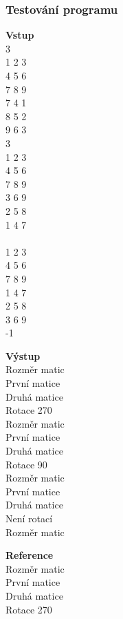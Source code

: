 \documentclass{beamer}
\begin{document}
\begin{frame}
    \frametitle{Testování programu}
    \begin{multicols}{4}
    \textbf{Vstup}\\
    \small{3\\
    1 2 3\\
    4 5 6\\
    7 8 9\\
    7 4 1\\
    8 5 2\\
    9 6 3\\
    3\\
    1 2 3\\
    4 5 6\\
    7 8 9\\
    3 6 9\\
    2 5 8\\
    1 4 7\\
    \\
    1 2 3\\
    4 5 6\\
    7 8 9\\
    1 4 7\\
    2 5 8\\
    3 6 9\\
    -1}

    \columnbreak
    \textbf{Výstup}\\
    \small{
    Rozměr matic\\
    První matice\\
    Druhá matice\\
    Rotace 270\\

    Rozměr matic\\
    První matice\\
    Druhá matice\\
    Rotace 90\\

    Rozměr matic\\
    První matice\\
    Druhá matice\\
    Není rotací\\

    Rozměr matic}

    \columnbreak
    \textbf{Reference}\\
    \small{
    Rozměr matic\\
    První matice\\
    Druhá matice\\
    Rotace 270\\

}
\end{multicols}
\end{frame}
\end{document}
